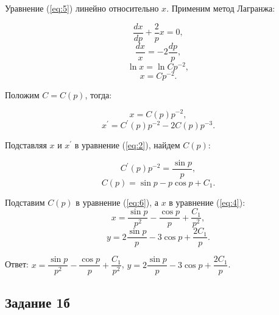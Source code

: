 \documentclass[11pt, a4paper]{article}
\begin{document}
	\par
	Уравнение (\ref{eq:5}) линейно относительно $x$. Применим метод Лагранжа:
	
	\begin{equation*}
    	\frac{dx}{dp} + \dfrac{2}{p} x = 0,
	\end{equation*}
	\begin{equation*}
    	\frac{dx}{x} = -2 \frac{dp}{p},
	\end{equation*}
	\begin{equation*}
    	\ln{x} = \ln{Cp^{-2}},
	\end{equation*}
	\begin{equation*}
    	x = Cp^{-2}.
	\end{equation*}
	
	\par
	Положим $C = C(p)$, тогда:
	
	\begin{equation}
    	x = C(p)p^{-2},\label{eq:6} 
	\end{equation}
	\begin{equation*}
		x^\prime = C^\prime(p)p^{-2} - 2C(p)p^{-3}.
	\end{equation*}
	
	\par
	Подставляя $x$ и $x^\prime$ в уравнение (\ref{eq:2}), найдем $C(p)$: 
	
	\begin{equation*}
    	C^\prime(p)p^{-2} = \dfrac{\sin{p}}{p},
	\end{equation*}
	\begin{equation*}
		C(p) = \sin{p} - p \cos{p} + C_1.
	\end{equation*}
	
	\par
	Подставим $C(p)$ в уравнение (\ref{eq:6}), а $x$ в уравнение  (\ref{eq:4}):
	\begin{equation*}
		x = \dfrac{\sin{p}}{p^2} - \dfrac{\cos{p}}{p} + \dfrac{C_1}{p^2},
	\end{equation*}
	\begin{equation*}
		y = 2\dfrac{\sin{p}}{p} - 3\cos{p} + \dfrac{2C_1}{p}.
	\end{equation*}
	
	\par\noindent
	Ответ: $x = \dfrac{\sin{p}}{p^2} - \dfrac{\cos{p}}{p} + \dfrac{C_1}{p^2}$, $y = 2\dfrac{\sin{p}}{p} - 3\cos{p} + \dfrac{2C_1}{p}$.
	
	
	\subsection*{Задание 1б}
		
\end{document}

